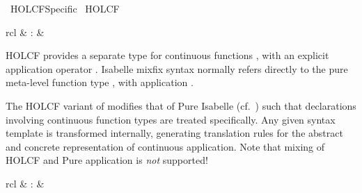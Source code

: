 %
\begin{isabellebody}%
\def\isabellecontext{HOLCF{\isacharunderscore}Specific}%
%
\isadelimtheory
\isanewline
\isanewline
%
\endisadelimtheory
%
\isatagtheory
{}\isamarkupfalse%
\ HOLCF{\isacharunderscore}Specific\isanewline
{}\ HOLCF\isanewline
{}%
\endisatagtheory
{\isafoldtheory}%
%
\isadelimtheory
%
\endisadelimtheory
%
\isamarkuptrue%
%
\isamarkuptrue%
%
\begin{isamarkuptext}%
\begin{matharray}{rcl}
    \hypertarget{command.HOLCF.consts}{\hyperlink{command.HOLCF.consts}{\mbox{}}} & : &  \\
  \end{matharray}

  HOLCF provides a separate type for continuous functions \isa{{\isachardoublequote}{\isasymalpha}\ {\isasymrightarrow}\ {\isasymbeta}{\isachardoublequote}}, with an explicit application operator .
  Isabelle mixfix syntax normally refers directly to the pure
  meta-level function type \isa{{\isachardoublequote}{\isasymalpha}\ {\isasymRightarrow}\ {\isasymbeta}{\isachardoublequote}}, with application .

  The HOLCF variant of \hyperlink{command.HOLCF.consts}{\mbox{}} modifies that of
  Pure Isabelle (cf.\ ) such that declarations
  involving continuous function types are treated specifically.  Any
  given syntax template is transformed internally, generating
  translation rules for the abstract and concrete representation of
  continuous application.  Note that mixing of HOLCF and Pure
  application is \emph{not} supported!%
\end{isamarkuptext}%
\isamarkuptrue%
%
\isamarkuptrue%
%
\begin{isamarkuptext}%
\begin{matharray}{rcl}
    \hypertarget{command.HOLCF.domain}{\hyperlink{command.HOLCF.domain}{\mbox{}}} & : &  \\
  \end{matharray}


\end{isamarkuptext}
\end{isabellebody}
